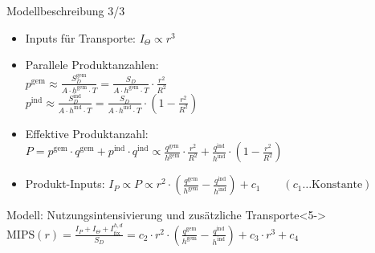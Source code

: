 \documentclass[beamer, xcolor={table,usenames,dvipsnames}]{beamer}
\begin{document}
    \begin{frame}{Modellbeschreibung 3/3}
       	\begin{itemize}
       		\item<1-> Inputs für Transporte: $I_\Theta \propto r^3$ \\[1em]
       		\item<2-> Parallele Produktanzahlen:\\[0.1cm]
       		$p^\text{gem} \approx \frac{S_D^\text{gem}}{A \cdot h^\text{gem} \cdot T}
       		= \frac{S_D}{A \cdot h^\text{gem} \cdot T} \cdot \frac{r^2}{R^2}$ \\[0.1cm]
       		$p^\text{ind} \approx \frac{S_D^\text{ind}}{A \cdot h^\text{ind} \cdot T}
       		= \frac{S_D}{A \cdot h^\text{ind} \cdot T} \cdot \left( 1 - \frac{r^2}{R^2} \right)$
       		\item<3-> Effektive Produktanzahl: \\
    		$P = p^\text{gem} \cdot q^\text{gem} + p^\text{ind} \cdot q^\text{ind} \propto \frac{q^\text{gem}}{h^\text{gem}} \cdot \frac{r^2}{R^2} + \frac{q^\text{ind}}{h^\text{ind}} \cdot \left( 1 - \frac{r^2}{R^2} \right)$
       		\item<4-> Produkt-Inputs: $I_P \propto P \propto r^2 \cdot \left( \frac{q^\text{gem}}{h^\text{gem}} - \frac{q^\text{ind}}{h^\text{ind}} \right) + c_1 \qquad (c_1 \dots \text{Konstante})$ \\[1em]
       	\end{itemize}
       	\begin{block}{Modell: Nutzungsintensivierung und zusätzliche Transporte}<5->
       		$\text{MIPS}(r) = \frac{I_P + I_\Theta + I_\text{fix}^{h,d}}{S_D} = c_2 \cdot r^2 \cdot \left( \frac{q^\text{gem}}{h^\text{gem}} - \frac{q^\text{ind}}{h^\text{ind}} \right) + c_3 \cdot r^3 + c_4$
       	\end{block}
    \end{frame}
  
\end{document}
